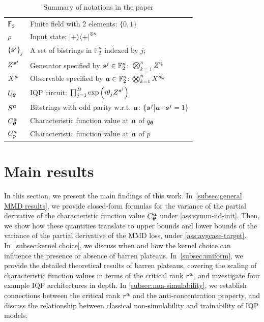 \documentclass{article}
\theoremstyle{plain}
\theoremstyle{definition}
\theoremstyle{remark}
\begin{document}
\begin{table}[t]
\centering
\caption{Summary of notations in the paper}
\label{tab:notation}
\setlength{\tabcolsep}{3pt}
\begin{tabular}{ll}
\toprule
$\mathbb{F}_2$ & Finite field with 2 elements: $\{0,1\}$\\
$\rho$ & Input state: $|+\rangle\!\langle+|^{\otimes n}$ \\
$\{\bm{s}^j\}_j$ & A set of bistrings in $\mathbb{F}_2^n$ indexed by $j$; \\
$Z^{{\bm{s}}^j}$ & Generator specified by ${\bm{s}^j} \in \mathbb{F}_2^n $: $\bigotimes_{k=1}^n Z^{s^j_k} $\\
$X^{\bm{a}}$ & Observable specified by ${\bm{a}} \in \mathbb{F}_2^n$: $\bigotimes_{k=1}^n X^{{\bm{a}}_k} $\\
$U_{{\bm{\theta}}}$ & IQP circuit: $\prod_{j=1}^D \exp \left(i\theta_j Z^{{\bm{s}}^j}\right)$  \\
$S^{{\bm{a}}}$ & Bitstrings with odd parity w.r.t. ${\bm{a}}$: $\{ {\bm{s}^j} \big| {\bm{a}} \cdot {\bm{s}^j} = 1 \}$\\
$C^{{\bm{a}}}_{{\bm{\theta}}}$ & Characteristic function value at ${\bm{a}}$ of $q_{\bm{\theta}}$\\
$C^{{\bm{a}}}_p$ & Characteristic function value at ${\bm{a}}$ of $p$ \\
\bottomrule
\end{tabular}
\end{table}

\section{Main results} \label{sec:main-result}
In this section, we present the main findings of this work. In~\cref{subsec:general MMD results}, we provide closed-form formulas for the variance of the partial derivative of the characteristic function value $C_{{\bm{\theta}}}^{{\bm{a}}}$ under \cref{ass:symm-iid-init}. Then, we show how these quantities translate to upper bounds and lower bounds of the variance of the partial derivative of the MMD loss, under \cref{ass:avgcase-target}. In~\cref{subsec:kernel choice}, we discuss when and how the kernel choice can influence the presence or absence of barren plateaus. In~\cref{subsec:uniform}, we provide the detailed theoretical results of barren plateaus, covering the scaling of characteristic function values in terms of the critical rank $r^{\bm{a}}$, and investigate four example IQP architectures in depth. 
In \cref{subsec:non-simulability}, we establish connections between the critical rank $r^{\bm{a}}$ and the anti-concentration property, and discuss the relationship between classical non-simulability and trainability of IQP models. 
\end{document}
